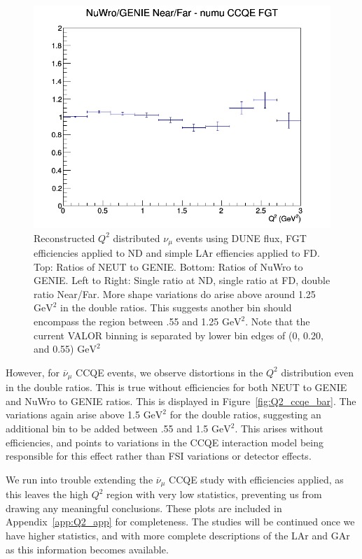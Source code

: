 \documentclass[12pt]{article}
\begin{document}
\begin{figure}[h]
\endminipage
{}
\includegraphics[width=\linewidth]{eff_Q2/FGT/ratios/CCQE_NuWro_GENIE_numu_NF_Q2.png}
\endminipage
\caption{Reconstructed $Q^2$ distributed $\nu_{\mu}$ events using DUNE flux, FGT efficiencies applied to ND and simple LAr effiencies applied to FD. Top: Ratios of NEUT to GENIE. Bottom: Ratios of NuWro to GENIE. Left to Right: Single ratio at ND, single ratio at FD, double ratio Near/Far. More shape variations do arise above around 1.25 $\textrm{GeV}^2$ in the double ratios. This suggests another bin should encompass the region between .55 and 1.25 $\textrm{GeV}^2$. Note that the current VALOR binning is separated by lower bin edges of (0, 0.20, and 0.55) $\textrm{GeV}^2$}
\label{fig:Q2_ccqe_FGT_eff}
\end{figure}
\FloatBarrier


However, for $\overline{\nu}_{\mu}$ CCQE events, we observe distortions in the $Q^2$ distribution even in the double ratios. This is true without efficiencies for both NEUT to GENIE and NuWro to GENIE ratios. This is displayed in Figure~\ref{fig:Q2_ccqe_bar}. The variations again arise above 1.5 $\textrm{GeV}^2$ for the double ratios, suggesting an additional bin to be added between .55 and 1.5 $\textrm{GeV}^2$. This arises without efficiencies, and points to variations in the CCQE interaction model being responsible for this effect rather than FSI variations or detector effects.

We run into trouble extending the $\overline{\nu}_{\mu}$ CCQE study with efficiencies applied, as this leaves the high $Q^2$ region with very low statistics, preventing us from drawing any meaningful conclusions. These plots are included in Appendix~\ref{app:Q2_app} for completeness. The studies will be continued once we have higher statistics, and with more complete descriptions of the LAr and GAr as this information becomes available.
\end{document}
